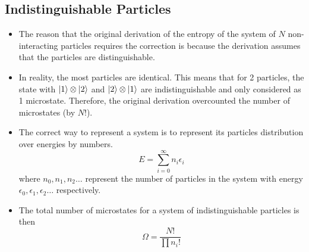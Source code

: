 \documentclass{article}
\begin{document}
\subsection{Indistinguishable Particles}
\begin{itemize}
    \item The reason that the original derivation of the entropy of the system of $N$ non-interacting particles requires the correction is because the derivation assumes that the particles are distinguishable. 
    \item In reality, the most particles are identical. This means that for 2 particles, the state with $\ket{1}\otimes\ket{2}$ and $\ket{2}\otimes\ket{1}$ are indistinguishable and only considered as 1 microstate. Therefore, the original derivation overcounted the number of microstates (by $N!$). 
    \item The correct way to represent a system is to represent its particles distribution over energies by numbers.
    \begin{equation}
        E=\sum_{i=0}^\infty n_i\epsilon_i
    \end{equation}
    where $n_0,n_1,n_2\dots$ represent the number of particles in the system with energy $\epsilon_0,\epsilon_1,\epsilon_2\dots$ respectively.
    \item The total number of microstates for a system of indistinguishable particles is then
    \begin{equation}
        \Omega=\frac{N!}{\prod n_i!}
    \end{equation}
\end{itemize}
\end{document}
